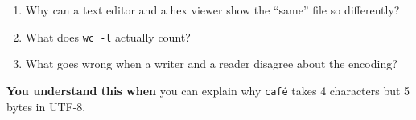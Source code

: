 \begin{enumerate}
\def\labelenumi{\arabic{enumi}.}
\tightlist
\item
  Why can a text editor and a hex viewer show the ``same'' file so differently?
\item
  What does \texttt{wc\ -l} actually count?
\item
  What goes wrong when a writer and a reader disagree about the encoding?
\end{enumerate}

\begin{understandbox}

\textbf{You understand this when} you can explain why \texttt{café} takes 4 characters but 5 bytes in UTF-8.

\end{understandbox}
